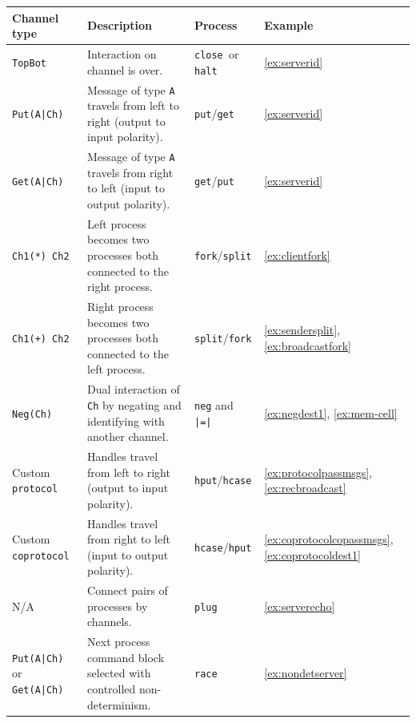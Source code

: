 \documentclass[11pt]{article}
\begin{document}
\begin{table}[!ht]
\begin{center}
	\quad \begin{tabular}{ |m{3.3cm} | m{6.75cm} | m{2.4cm} | m{1.4cm} | }
	\hline
		 {\bf Channel type} & {\bf Description} & {\bf Process} \newline {\bf command} & {\bf Example} \\
		 \hline      
		 \lstinline$TopBot$ & Interaction on channel is over.  & \lstinline$close $or \lstinline$halt$ & \ref{ex:serverid} \\
		 \hline      
		 \lstinline$Put(A|Ch)$ & Message of type \lstinline$A$ travels from left to right (output to input polarity).  & \lstinline$put$/\lstinline$get$ & \ref{ex:serverid} \\
		 \hline      
		 \lstinline$Get(A|Ch)$ & Message of type \lstinline$A$ travels from right to left (input to output polarity). & \lstinline$get$/\lstinline$put$ & \ref{ex:serverid} \\
		 \hline      
		 \lstinline$Ch1(*) Ch2$ & Left process becomes two processes both connected to the right process.  & \lstinline$fork$/\lstinline$split$ & \ref{ex:clientfork} \\
		 \hline
		 \lstinline$Ch1(+) Ch2$ & Right process becomes two processes both connected to the left process.  & \lstinline$split$/\lstinline$fork$ & \ref{ex:sendersplit}, \ref{ex:broadcastfork} \\
		 \hline      
		 \lstinline$Neg(Ch)$ & Dual interaction of \lstinline$Ch$ by negating and identifying with another channel.  & \lstinline$neg$ and \lstinline$|=|$  &  \ref{ex:negdest1}, \ref{ex:mem-cell} \\
		 \hline
		 Custom \lstinline$protocol$ & Handles travel from left to right \newline (output to input polarity). & \lstinline$hput$/\lstinline$hcase$ & \ref{ex:protocolpassmsgs}, \ref{ex:recbroadcast} \\
		 \hline
		 Custom \lstinline$coprotocol$ & Handles travel from right to left \newline (input to output polarity). & \lstinline$hcase$/\lstinline$hput$ & \ref{ex:coprotocolcopassmsgs}, \ref{ex:coprotocoldest1} \\
		 \hline
		  N/A & Connect pairs of processes by channels.  & \lstinline$plug$ & \ref{ex:serverecho} \\
		 \hline
		  \lstinline$Put(A|Ch)$ or \newline \lstinline$Get(A|Ch)$ & Next process command block selected with controlled non-determinism.  & \lstinline$race$ & \ref{ex:nondetserver} \\

\end{tabular}
\end{center}
\end{table}
\end{document}

